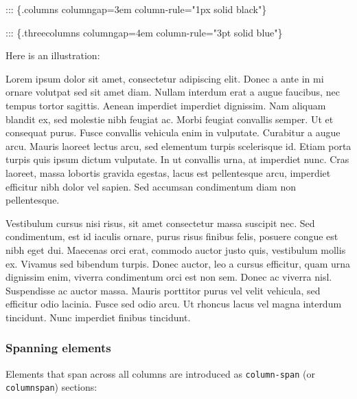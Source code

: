 \documentclass[
]{article}
\newenvironment{Shaded}{}{}
\newcommand{\NormalTok}[1]{#1}
\begin{document}
\begin{Shaded}
\begin{Highlighting}[]
\NormalTok{::: \{.columns columngap=3em column{-}rule="1px solid black"\}}

\NormalTok{::: \{.threecolumns columngap=4em column{-}rule="3pt solid blue"\}}
\end{Highlighting}
\end{Shaded}

Here is an illustration:

{\setlength{\columnsep}{4em}
\setlength{\columnseprule}{ 3pt}
\renewcommand{\columnseprulecolor}{\color{blue}}
\begin{multicols}{3}

Lorem ipsum dolor sit amet, consectetur adipiscing elit. Donec a ante in
mi ornare volutpat sed sit amet diam. Nullam interdum erat a augue
faucibus, nec tempus tortor sagittis. Aenean imperdiet imperdiet
dignissim. Nam aliquam blandit ex, sed molestie nibh feugiat ac. Morbi
feugiat convallis semper. Ut et consequat purus. Fusce convallis
vehicula enim in vulputate. Curabitur a augue arcu. Mauris laoreet
lectus arcu, sed elementum turpis scelerisque id. Etiam porta turpis
quis ipsum dictum vulputate. In ut convallis urna, at imperdiet nunc.
Cras laoreet, massa lobortis gravida egestas, lacus est pellentesque
arcu, imperdiet efficitur nibh dolor vel sapien. Sed accumsan
condimentum diam non pellentesque.

Vestibulum cursus nisi risus, sit amet consectetur massa suscipit nec.
Sed condimentum, est id iaculis ornare, purus risus finibus felis,
posuere congue est nibh eget dui. Maecenas orci erat, commodo auctor
justo quis, vestibulum mollis ex. Vivamus sed bibendum turpis. Donec
auctor, leo a cursus efficitur, quam urna dignissim enim, viverra
condimentum orci est non sem. Donec ac viverra nisl. Suspendisse ac
auctor massa. Mauris porttitor purus vel velit vehicula, sed efficitur
odio lacinia. Fusce sed odio arcu. Ut rhoncus lacus vel magna interdum
tincidunt. Nunc imperdiet finibus tincidunt.

\end{multicols}
}

\hypertarget{spanning-elements}{%
\subsubsection{Spanning elements}\label{spanning-elements}}

Elements that span across all columns are introduced as
\texttt{column-span} (or \texttt{columnspan}) sections:
\end{document}
